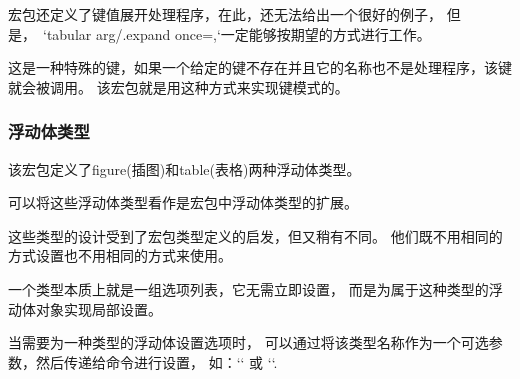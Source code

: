   宏包还定义了键值展开处理程序，在此，还无法给出一个很好的例子，
  但是，\ `tabular arg/.expand once=\colspec,`一定能够按期望的方式进行工作。

  这是一种特殊的键，如果一个给定的键不存在并且它的名称也不是处理程序，该键就会被调用。
  该宏包就是用这种方式来实现键模式的。
\endkeytypedoc

\subsubsection{浮动体类型}
\label{styles}

该宏包定义了figure(插图)和table(表格)两种浮动体类型。

可以将这些浮动体类型看作是宏包中浮动体类型的扩展。

这些类型的设计受到了宏包类型定义的启发，但又稍有不同。
他们既不用相同的方式设置也不用相同的方式来使用。

一个类型本质上就是一组选项列表，它无需立即设置，
而是为属于这种类型的浮动体对象实现局部设置。

当需要为一种类型的浮动体设置选项时，
可以通过将该类型名称作为一个可选参数，然后传递给\cmd{\objectset}命令进行设置，
如：`` 或 ``.


